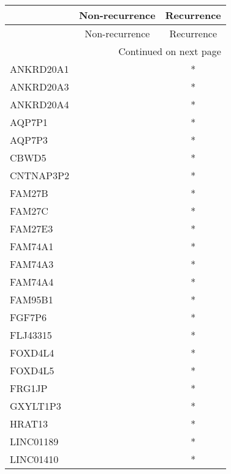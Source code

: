 \begin{longtable}{lcc}
\toprule
{} & Non-recurrence & Recurrence \\
\midrule
\endfirsthead

\toprule
{} & Non-recurrence & Recurrence \\
\midrule
\endhead
\midrule
\multicolumn{3}{r}{{Continued on next page}} \\
\midrule
\endfoot

\bottomrule
\endlastfoot
ANKRD20A1          &                &          * \\
ANKRD20A3          &                &          * \\
ANKRD20A4          &                &          * \\
AQP7P1             &                &          * \\
AQP7P3             &                &          * \\
CBWD5              &                &          * \\
CNTNAP3P2          &                &          * \\
FAM27B             &                &          * \\
FAM27C             &                &          * \\
FAM27E3            &                &          * \\
FAM74A1            &                &          * \\
FAM74A3            &                &          * \\
FAM74A4            &                &          * \\
FAM95B1            &                &          * \\
FGF7P6             &                &          * \\
FLJ43315           &                &          * \\
FOXD4L4            &                &          * \\
FOXD4L5            &                &          * \\
FRG1JP             &                &          * \\
GXYLT1P3           &                &          * \\
HRAT13             &                &          * \\
LINC01189          &                &          * \\
LINC01410          &                &          * \\

\end{longtable}
